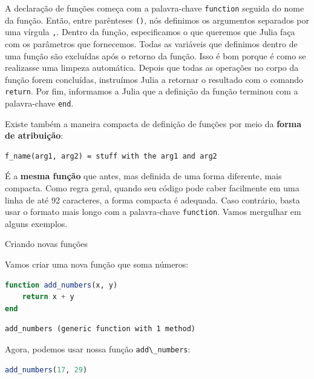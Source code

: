 \documentclass[
  notoc %
]{tufte-book}
\makeatletter
\newcommand{\passthrough}[1]{#1}
\renewcommand\subsubsection{%
\@startsection{subsubsection}{3}{\z@ }{-3.25ex\@plus -1ex \@minus -.2ex}{1.5ex \@plus .2ex}{\normalfont \normalsize \bfseries }
}
\makeatother
\begin{document}
A declaração de funções começa com a palavra-chave
\passthrough{\lstinline!function!} seguida do nome da função. Então,
entre parênteses \passthrough{\lstinline!()!}, nós definimos os
argumentos separados por uma vírgula \passthrough{\lstinline!,!}. Dentro
da função, especificamos o que queremos que Julia faça com os parâmetros
que fornecemos. Todas as variáveis que definimos dentro de uma função
são excluídas após o retorno da função. Isso é bom porque é como se
realizasse uma limpeza automática. Depois que todas as operações no
corpo da função forem concluídas, instruímos Julia a retornar o
resultado com o comando \passthrough{\lstinline!return!}. Por fim,
informamos a Julia que a definição da função terminou com a
palavra-chave \passthrough{\lstinline!end!}.

Existe também a maneira compacta de definição de funções por meio da
\textbf{forma de atribuição}:

\begin{lstlisting}
f_name(arg1, arg2) = stuff with the arg1 and arg2
\end{lstlisting}

É a \textbf{mesma função} que antes, mas definida de uma forma
diferente, mais compacta. Como regra geral, quando seu código pode caber
facilmente em uma linha de até 92 caracteres, a forma compacta é
adequada. Caso contrário, basta usar o formato mais longo com a
palavra-chave \passthrough{\lstinline!function!}. Vamos mergulhar em
alguns exemplos.

\hypertarget{sec:function_example}{%
\subsubsection{Criando novas funções}\label{sec:function_example}}

Vamos criar uma nova função que soma números:

\begin{lstlisting}[language=Julia]
function add_numbers(x, y)
    return x + y
end
\end{lstlisting}

\begin{lstlisting}[language=Output]
add_numbers (generic function with 1 method)
\end{lstlisting}

Agora, podemos usar nossa função \passthrough{\lstinline!add\_numbers!}:

\begin{lstlisting}[language=Julia]
add_numbers(17, 29)
\end{lstlisting}
\end{document}
